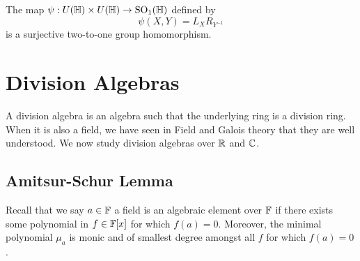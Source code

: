 \documentclass[a4paper]{article}
\begin{document}
\begin{thm}{}{} The map $\psi:U(\mathbb{H})\times U(\mathbb{H})\to\text{SO}_1(\mathbb{H})$ defined by $$\psi(X,Y)=L_XR_{Y^{-1}}$$ is a surjective two-to-one group homomorphism. 
\end{thm}

\pagebreak
\section{Division Algebras}
A division algebra is an algebra such that the underlying ring is a division ring. When it is also a field, we have seen in Field and Galois theory that they are well understood. We now study division algebras over $\mathbb{R}$ and $\mathbb{C}$. 

\subsection{Amitsur-Schur Lemma}
Recall that we say $a\in\mathbb{F}$ a field is an algebraic element over $\mathbb{F}$ if there exists some polynomial in $f\in\mathbb{F}[x]$ for which $f(a)=0$. Moreover, the minimal polynomial $\mu_a$ is monic and of smallest degree amongst all $f$ for which $f(a)=0$. 
\end{document}
